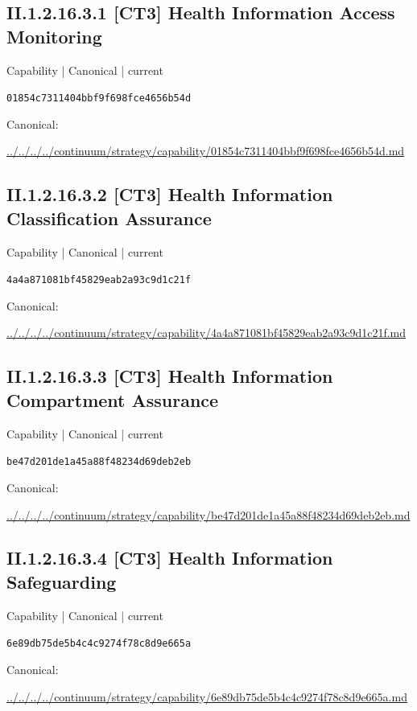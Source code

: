 \documentclass[10pt,a4paper]{article}
\begin{document}
\subsection*{II.1.2.16.3.1 [CT3] Health Information Access Monitoring}
\label{element-01854c7311404bbf9f698fce4656b54d}
{\small Capability | Canonical | current}\par
\texttt{01854c7311404bbf9f698fce4656b54d}\par
Canonical: \par
{\footnotesize\url{../../../../continuum/strategy/capability/01854c7311404bbf9f698fce4656b54d.md}}\par
\subsection*{II.1.2.16.3.2 [CT3] Health Information Classification Assurance}
\label{element-4a4a871081bf45829eab2a93c9d1c21f}
{\small Capability | Canonical | current}\par
\texttt{4a4a871081bf45829eab2a93c9d1c21f}\par
Canonical: \par
{\footnotesize\url{../../../../continuum/strategy/capability/4a4a871081bf45829eab2a93c9d1c21f.md}}\par
\subsection*{II.1.2.16.3.3 [CT3] Health Information Compartment Assurance}
\label{element-be47d201de1a45a88f48234d69deb2eb}
{\small Capability | Canonical | current}\par
\texttt{be47d201de1a45a88f48234d69deb2eb}\par
Canonical: \par
{\footnotesize\url{../../../../continuum/strategy/capability/be47d201de1a45a88f48234d69deb2eb.md}}\par
\subsection*{II.1.2.16.3.4 [CT3] Health Information Safeguarding}
\label{element-6e89db75de5b4c4c9274f78c8d9e665a}
{\small Capability | Canonical | current}\par
\texttt{6e89db75de5b4c4c9274f78c8d9e665a}\par
Canonical: \par
{\footnotesize\url{../../../../continuum/strategy/capability/6e89db75de5b4c4c9274f78c8d9e665a.md}}\par
\end{document}
